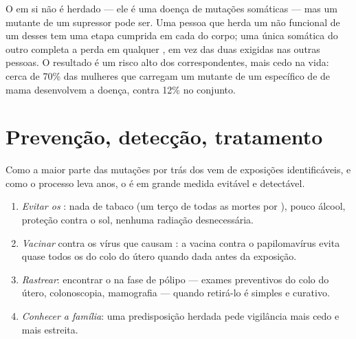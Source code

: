 \begin{proposition}\label{prop:g11:cancer:inherited}
O  em si não é herdado --- ele é uma doença de mutações somáticas
--- mas um  mutante de um  supressor pode ser. Uma pessoa que
herda um  não funcional de um  desses tem uma etapa cumprida
em cada  do corpo; uma única  somática do outro 
completa a perda em qualquer , em vez das duas exigidas nas
outras pessoas. O resultado é um risco alto dos 
correspondentes, mais cedo na vida: cerca de 70\% das mulheres que
carregam um  mutante de um  específico de  de mama
desenvolvem a doença, contra 12\% no conjunto.
\end{proposition}
\admitted

\section{Prevenção, detecção, tratamento}

\begin{method}\label{met:g11:cancer:prevention}
Como a maior parte das mutações por trás dos  vem de
exposições identificáveis, e como o processo leva anos, o  é em
grande medida evitável e detectável.
\begin{enumerate}
  \item \emph{Evitar os }: nada de tabaco (um terço de todas
        as mortes por ), pouco álcool, proteção contra o sol,
        nenhuma radiação desnecessária.
  \item \emph{Vacinar} contra os vírus que causam : a vacina
        contra o papilomavírus evita quase todos os  do colo
        do útero quando dada antes da exposição.
  \item \emph{Rastrear}: encontrar o  na fase de pólipo ---
        exames preventivos do colo do útero, colonoscopia, mamografia
        --- quando retirá-lo é simples e curativo.
  \item \emph{Conhecer a família}: uma predisposição herdada pede
        vigilância mais cedo e mais estreita.
\end{enumerate}
\end{method}

